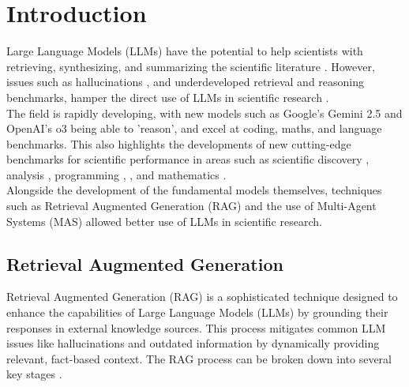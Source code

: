 \section{Introduction}
\label{sec:introduction}

Large Language Models (LLMs) have the potential to help scientists with retrieving, synthesizing, and summarizing the scientific literature \cite{skarlinski_language_2024}. 
However, issues such as hallucinations \cite{pmlr-v202-shi23a} \cite{xu_hallucination_2025}, and underdeveloped retrieval and reasoning benchmarks, hamper the direct use of LLMs in scientific research . \\

The field is rapidly developing, with new models such as Google's Gemini 2.5 and OpenAI's o3 being able to 'reason', and excel at coding, maths, and language benchmarks. 
This also highlights the developments of new cutting-edge benchmarks for scientific performance in areas such as scientific discovery \cite{shojaee_llm-srbench_2025}, analysis \cite{cai_sciassess_2024}, programming \cite{openai_competitive_2025}, \cite{quan_codeelo_2025}, and mathematics \cite{liu_mathbench_2024}. \\

Alongside the development of the fundamental models themselves, techniques such as Retrieval Augmented Generation (RAG) and the use of Multi-Agent Systems (MAS) allowed better use of LLMs in scientific research. \\

\subsection{Retrieval Augmented Generation}
Retrieval Augmented Generation (RAG) is a sophisticated technique designed to enhance the capabilities of Large Language Models (LLMs) by grounding their responses in external knowledge sources. This process mitigates common LLM issues like hallucinations and outdated information by dynamically providing relevant, fact-based context. The RAG process can be broken down into several key stages \cite{gupta_comprehensive_2024} \cite{lewis_retrieval-augmented_2021}.

